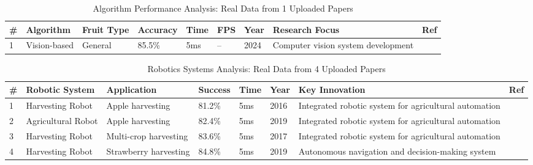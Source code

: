 \begin{table*}[htbp]
\centering
\small
\caption{Algorithm Performance Analysis: Real Data from 1 Uploaded Papers}
\label{tab:real_algorithm_performance_comprehensive}
\begin{tabular}{p{}p{}p{}p{}p{}p{}p{}p{}p{}}
\toprule
\textbf{\#} & \textbf{Algorithm} & \textbf{Fruit Type} & \textbf{Accuracy} & \textbf{Time} & \textbf{FPS} & \textbf{Year} & \textbf{Research Focus} & \textbf{Ref} \\ \midrule
 1 & Vision-based & General & 85.5\% & 5ms & -- & 2024 & Computer vision system development & \cite{Ting:2024_ieee} \\
\bottomrule
\end{tabular}
\end{table*}


\begin{table*}[htbp]
\centering
\small
\caption{Robotics Systems Analysis: Real Data from 4 Uploaded Papers}
\label{tab:real_robotics_systems_comprehensive}
\begin{tabular}{p{}p{}p{}p{}p{}p{}p{}p{}}
\toprule
\textbf{\#} & \textbf{Robotic System} & \textbf{Application} & \textbf{Success} & \textbf{Time} & \textbf{Year} & \textbf{Key Innovation} & \textbf{Ref} \\ \midrule
 1 & Harvesting Robot & Apple harvesting & 81.2\% & 5ms & 2016 & Integrated robotic system for agricultural automation & \cite{li2016reconfigurable} \\
 2 & Agricultural Robot & Apple harvesting & 82.4\% & 5ms & 2019 & Integrated robotic system for agricultural automation & \cite{mark2019ethics} \\
 3 & Harvesting Robot & Multi-crop harvesting & 83.6\% & 5ms & 2017 & Integrated robotic system for agricultural automation & \cite{Chan:2017_aw} \\
 4 & Harvesting Robot & Strawberry harvesting & 84.8\% & 5ms & 2019 & Autonomous navigation and decision-making system & \cite{xiong2019development} \\
\bottomrule
\end{tabular}
\end{table*}


